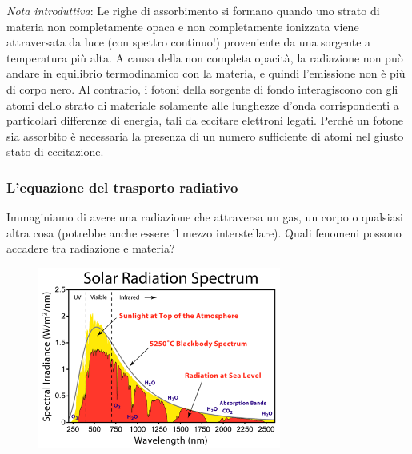 \textit{Nota introduttiva}: Le righe di assorbimento si formano quando uno strato di materia non completamente opaca e non completamente ionizzata viene attraversata da luce (con spettro continuo!) proveniente da una sorgente a temperatura più alta. A causa della non completa opacità, la radiazione non può andare in equilibrio termodinamico con la materia, e quindi l'emissione non è più di corpo nero. Al contrario, i fotoni della sorgente di fondo interagiscono con gli atomi dello strato di materiale solamente alle lunghezze d'onda corrispondenti a particolari differenze di energia, tali da eccitare elettroni legati. Perché un fotone sia assorbito è necessaria la presenza di un numero sufficiente di atomi nel giusto stato di eccitazione.

\subsubsection{L'equazione del trasporto radiativo}

Immaginiamo di avere una radiazione che attraversa un gas, un corpo o qualsiasi altra cosa (potrebbe anche essere il mezzo interstellare). Quali fenomeni possono accadere tra radiazione e materia?


\begin{figure}[H]
   \centering
   \includegraphics[width=8cm]{immagini/spettro_solare.png}
\end{figure}

